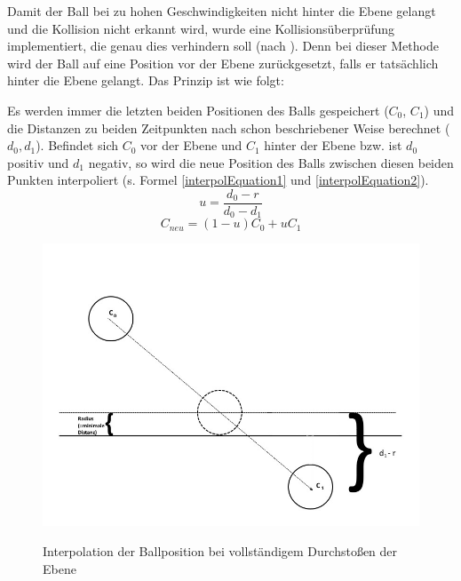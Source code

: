 Damit der Ball bei zu hohen Geschwindigkeiten nicht hinter die Ebene gelangt und die Kollision nicht erkannt wird, wurde eine Kollisionsüberprüfung implementiert, die genau dies verhindern soll (nach \cite{migGom:1999}). Denn bei dieser Methode wird der Ball auf eine Position vor der Ebene zurückgesetzt, falls er tatsächlich hinter die Ebene gelangt. Das Prinzip ist wie folgt:

Es werden immer die letzten beiden Positionen des Balls gespeichert ($C_0$, $C_1$) und die Distanzen zu beiden Zeitpunkten nach schon beschriebener Weise berechnet ($d_0, d_1$).
Befindet sich $C_0$ vor der Ebene und $C_1$ hinter der Ebene bzw. ist $d_0$ positiv und $d_1$ negativ, so wird die neue Position des Balls zwischen diesen beiden Punkten interpoliert (s. Formel \ref{interpolEquation1} und \ref{interpolEquation2}). 
\begin{equation}	
\label{interpolEquation1}
	u = \frac{d_0 - r}{d_0 - d_1}
\end{equation}
\begin{equation}	
\label{interpolEquation2}
	C_{neu} = (1-u)C_0 + uC_1
\end{equation}

\begin{figure}[h]
   \begin{center}
       \includegraphics[scale=0.5]{bilder/interpolation}\label{fig_interpolation}
   \end{center}
    
    \caption{Interpolation der Ballposition bei vollständigem Durchstoßen der Ebene}
        \label{fig_interpol}
\end{figure} 

